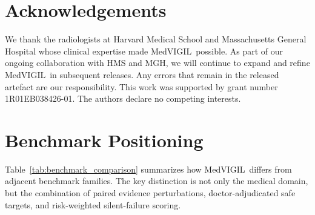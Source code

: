\documentclass{article}
\newcommand{\medvigil}{MedVIGIL}
\begin{document}
\section*{Acknowledgements}
\label{app:acknowledgments}

We thank the radiologists at Harvard Medical School and Massachusetts General Hospital whose clinical expertise made \medvigil\ possible. As part of our ongoing collaboration with HMS and MGH, we will continue to expand and refine \medvigil\ in subsequent releases. Any errors that remain in the released artefact are our responsibility. This work was supported by grant number 1R01EB038426-01. The authors declare no competing interests.

\clearpage



\clearpage
\appendix
\raggedbottom

\section{Benchmark Positioning}
\label{app:benchmark_positioning}

Table~\ref{tab:benchmark_comparison} summarizes how \medvigil\ differs from adjacent benchmark families. The key distinction is not only the medical domain, but the combination of paired evidence perturbations, doctor-adjudicated safe targets, and risk-weighted silent-failure scoring.
\end{document}
